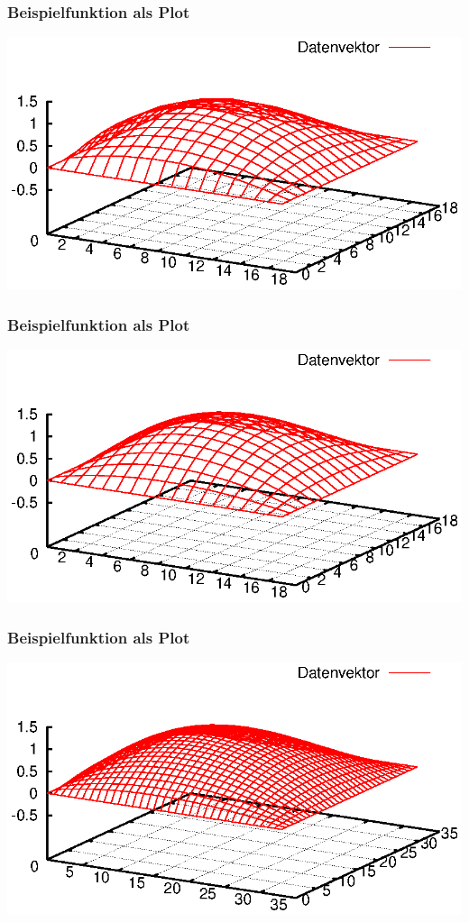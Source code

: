 \documentclass{beamer}
\begin{document}
\begin{frame}\frametitle{Beispielfunktion als Plot}\includegraphics[trim=25 0 25 0, clip, width=\textwidth]{plots/006}\end{frame}
\begin{frame}\frametitle{Beispielfunktion als Plot}\includegraphics[trim=25 0 25 0, clip, width=\textwidth]{plots/007}\end{frame}
\begin{frame}\frametitle{Beispielfunktion als Plot}\includegraphics[trim=25 0 25 0, clip, width=\textwidth]{plots/008}\end{frame}
\end{document}
